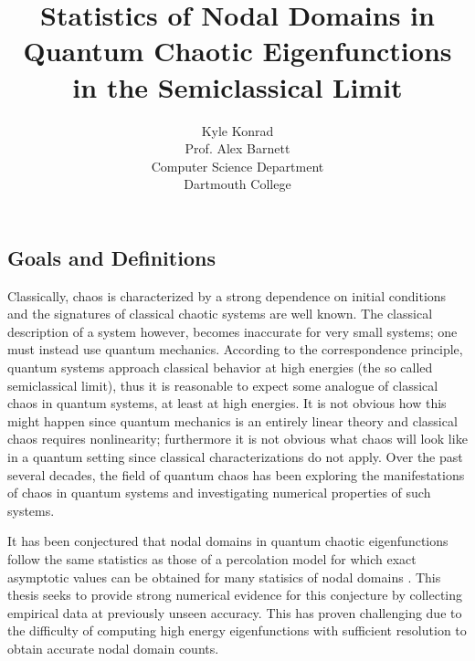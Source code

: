 \documentclass[english]{article}
\begin{document}
\title{Statistics of Nodal Domains in Quantum Chaotic Eigenfunctions in the Semiclassical Limit}
\author{Kyle Konrad \\
  Prof. Alex Barnett \\
  Computer Science Department \\
  Dartmouth College}
\maketitle

\begin{multicols}{2}

\section*{Goals and Definitions}

Classically, chaos is characterized by a strong dependence on initial conditions and the signatures of classical chaotic systems are well known. The classical description of a system however, becomes inaccurate for very small systems; one must instead use quantum mechanics. According to the correspondence principle, quantum systems approach classical behavior at high energies (the so called semiclassical limit), thus it is reasonable to expect some analogue of classical chaos in quantum systems, at least at high energies. It is not obvious how this might happen since quantum mechanics is an entirely linear theory and classical chaos requires nonlinearity; furthermore it is not obvious what chaos will look like in a quantum setting since classical characterizations do not apply. Over the past several decades, the field of quantum chaos has been exploring the manifestations of chaos in quantum systems and investigating numerical properties of such systems.

It has been conjectured that nodal domains in quantum chaotic eigenfunctions follow the same statistics as those of a percolation model for which exact asymptotic values can be obtained for many statisics of nodal domains \cite{bogolmony}. This thesis seeks to provide strong numerical evidence for this conjecture by collecting empirical data at previously unseen accuracy. This has proven challenging due to the difficulty of computing high energy eigenfunctions with sufficient resolution to obtain accurate nodal domain counts.



\end{multicols}
\end{document}
